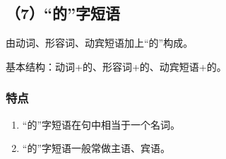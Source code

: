 \subsection{（7）“的”字短语}
由动词、形容词、动宾短语加上“的”构成。

基本结构：动词+的、形容词+的、动宾短语+的。

\subsubsection*{特点}
\begin{enumerate}
    \item “的”字短语在句中相当于一个名词。
    \item “的”字短语一般常做主语、宾语。
\end{enumerate}